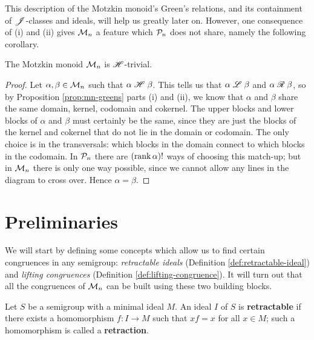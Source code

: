 This description of the Motzkin monoid's Green's relations, and its containment
of $\mathrel{\mathscr{J}}$-classes and ideals, will help us greatly later on.  However, one
consequence of (i) and (ii) gives $\mathcal{M}_n$ a feature which $\mathcal{P}_n$ does not
share, namely the following corollary.

\begin{corollary}
  \label{cor:mn-h-trivial}
  The Motzkin monoid $\mathcal{M}_n$ is $\mathrel{\mathscr{H}}$-trivial.
  \begin{proof}
    Let $\alpha, \beta \in \mathcal{M}_n$ such that $\alpha \mathrel{\mathscr{H}} \beta$.  This tells us
    that $\alpha \mathrel{\mathscr{L}} \beta$ and $\alpha \mathrel{\mathscr{R}} \beta$, so by Proposition
    \ref{prop:mn-greens} parts (i) and (ii), we know that $\alpha$ and $\beta$
    share the same domain, kernel, codomain and cokernel.  The upper blocks and
    lower blocks of $\alpha$ and $\beta$ must certainly be the same, since they
    are just the blocks of the kernel and cokernel that do not lie in the domain
    or codomain.  The only choice is in the transversals: which blocks in the
    domain connect to which blocks in the codomain.  In $\mathcal{P}_n$ there are
    $(\operatorname{rank} \alpha)!$ ways of choosing this match-up; but in $\mathcal{M}_n$ there is
    only one way possible, since we cannot allow any lines in the diagram to
    cross over.  Hence $\alpha = \beta$.
  \end{proof}
\end{corollary}


\section{Preliminaries}
\label{sec:motzkin-prelim}
We will start by defining some concepts which allow us to find certain
congruences in any semigroup: \textit{retractable ideals} (Definition
\ref{def:retractable-ideal}) and \textit{lifting congruences} (Definition
\ref{def:lifting-congruence}).  It will turn out that all the congruences of
$\mathcal{M}_n$ can be built using these two building blocks.

\begin{definition}
  \label{def:retractable-ideal}
   
  Let $S$ be a semigroup with a minimal ideal $M$.  An ideal $I$ of $S$ is
  \textbf{retractable} if there exists a homomorphism $f: I \to M$ such that
  $xf = x$ for all $x \in M$; such a homomorphism is called a
  \textbf{retraction}.
\end{definition}

